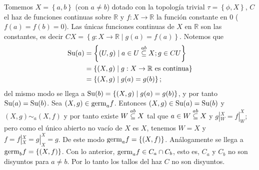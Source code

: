 \begin{Ejm}
   Tomemos $X=\left\lbrace a,b\right\rbrace$ (con $a\neq b$) dotado con la topología trivial $\tau=\left\lbrace \phi,X\right\rbrace$, $C$ el haz de funciones continuas sobre $\mathbb{R}$ y $f:X\to \mathbb{R}$ la función constante en $0$ ($f(a)=f(b)=0$). Las únicas funciones continuas de $X$ en $\mathbb{R}$ son las constantes, es decir $CX=\left\lbrace g:X\to\mathbb{R}\mid g(a)=f(a)\right\rbrace$. Notemos que
   $$
   \begin{aligned}
      \normalfont{\text{Su}}(a)&=\left\lbrace (U,g)\mid a\in U\stackrel{ab}{\subseteq} X;g\in CU\right\rbrace\\
            &=\left\lbrace (X,g)\mid g:X\to\mathbb{R} \text{ es continua}\right\rbrace\\
            &=\left\lbrace (X,g)\mid g(a)=g(b)\right\rbrace;\\
   \end{aligned}
   $$
   del mismo modo se llega a $\normalfont{\text{Su}}(b)=\left\lbrace (X,g)\mid g(a)=g(b)\right\rbrace$, y por tanto $\normalfont{\text{Su}}(a)=\normalfont{\text{Su}}(b)$. Sea $(X,g)\in\normalfont{\text{germ}}_{a}f$. Entonces $(X,g)\in\normalfont{\text{Su}}(a)=\normalfont{\text{Su}}(b)$ y $(X,g)\sim_{a}(X,f)$ y por tanto existe $W\stackrel{ab}{\subseteq} X$ tal que $a\in W\stackrel{ab}{\subseteq} X$ y $g|^{X}_{W}=f|^{X}_{W}$; pero como el único abierto no vacío de $X$ es $X$, tenemos $W=X$ y $f=f|^{X}_{X}=g|^{X}_{X}=g$. De este modo $\normalfont{\text{germ}}_{a}f=\left\lbrace (X,f)\right\rbrace$. Análogamente se llega a $\normalfont{\text{germ}}_{b}f=\left\lbrace (X,f)\right\rbrace$. Con lo anterior, $\normalfont{\text{germ}}_{a}f\in C_{a}\cap C_{b}$, esto es, $C_a$ y $C_b$ no son disyuntos para $a\neq b$. Por lo tanto los tallos del haz $C$ no son disyuntos.
\end{Ejm}

